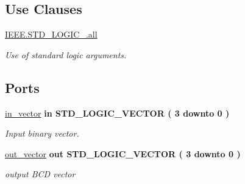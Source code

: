 \subsection*{Use Clauses}
 \begin{DoxyCompactItemize}
\item 
\hypertarget{classBCD__block_a68c233289eaf7d2601307bdd93b4c299}{\hyperlink{classBCD__block_a68c233289eaf7d2601307bdd93b4c299}{I\-E\-E\-E.\-S\-T\-D\-\_\-\-L\-O\-G\-I\-C\-\_.\-all}   }\label{classBCD__block_a68c233289eaf7d2601307bdd93b4c299}

\begin{DoxyCompactList}\small\item\em Use of standard logic arguments. \end{DoxyCompactList}\end{DoxyCompactItemize}
\subsection*{Ports}
 \begin{DoxyCompactItemize}
\item 
\hypertarget{classBCD__block_a74bbc5867d62a92f3255225da1687bcb}{\hyperlink{classBCD__block_a74bbc5867d62a92f3255225da1687bcb}{in\-\_\-vector}  {\bfseries {\bfseries \textcolor{vhdlkeyword}{in}\textcolor{vhdlchar}{ }}} {\bfseries \textcolor{comment}{S\-T\-D\-\_\-\-L\-O\-G\-I\-C\-\_\-\-V\-E\-C\-T\-O\-R}\textcolor{vhdlchar}{ }\textcolor{vhdlchar}{(}\textcolor{vhdlchar}{ }\textcolor{vhdlchar}{ } \textcolor{vhdldigit}{3} \textcolor{vhdlchar}{ }\textcolor{vhdlchar}{ }\textcolor{vhdlchar}{ }\textcolor{vhdlkeyword}{downto}\textcolor{vhdlchar}{ }\textcolor{vhdlchar}{ }\textcolor{vhdlchar}{ } \textcolor{vhdldigit}{0} \textcolor{vhdlchar}{ }\textcolor{vhdlchar}{)}\textcolor{vhdlchar}{ }} }\label{classBCD__block_a74bbc5867d62a92f3255225da1687bcb}

\begin{DoxyCompactList}\small\item\em Input binary vector. \end{DoxyCompactList}\item 
\hypertarget{classBCD__block_a16d23e0812e4ff5fdb6428217589754d}{\hyperlink{classBCD__block_a16d23e0812e4ff5fdb6428217589754d}{out\-\_\-vector}  {\bfseries {\bfseries \textcolor{vhdlkeyword}{out}\textcolor{vhdlchar}{ }}} {\bfseries \textcolor{comment}{S\-T\-D\-\_\-\-L\-O\-G\-I\-C\-\_\-\-V\-E\-C\-T\-O\-R}\textcolor{vhdlchar}{ }\textcolor{vhdlchar}{(}\textcolor{vhdlchar}{ }\textcolor{vhdlchar}{ } \textcolor{vhdldigit}{3} \textcolor{vhdlchar}{ }\textcolor{vhdlchar}{ }\textcolor{vhdlchar}{ }\textcolor{vhdlkeyword}{downto}\textcolor{vhdlchar}{ }\textcolor{vhdlchar}{ }\textcolor{vhdlchar}{ } \textcolor{vhdldigit}{0} \textcolor{vhdlchar}{ }\textcolor{vhdlchar}{)}\textcolor{vhdlchar}{ }} }\label{classBCD__block_a16d23e0812e4ff5fdb6428217589754d}

\begin{DoxyCompactList}\small\item\em output B\-C\-D vector \end{DoxyCompactList}\end{DoxyCompactItemize}


